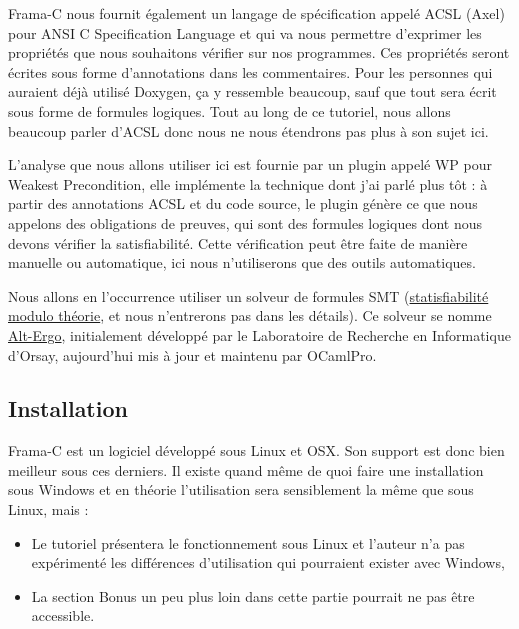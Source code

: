 \documentclass[12pt,francais,]{scrbook}
\newenvironment{zdsalertblock}[1]{%
  \tcolorbox[beamer,%
    noparskip,breakable,
    colback=LightCoral,colframe=DarkRed,%
    colbacklower=Tomato,%
    title=#1]
}{\endtcolorbox}
\begin{document}
Frama-C nous fournit également un langage de spécification appelé ACSL
(\og{}Axel\fg{}) pour ANSI C Specification Language et qui va nous permettre
d'exprimer les propriétés que nous souhaitons vérifier sur nos
programmes. Ces propriétés seront écrites sous forme d'annotations dans
les commentaires. Pour les personnes qui auraient déjà utilisé Doxygen,
ça y ressemble beaucoup, sauf que tout sera écrit sous forme de formules
logiques. Tout au long de ce tutoriel, nous allons beaucoup parler
d'ACSL donc nous ne nous étendrons pas plus à son sujet ici.

L'analyse que nous allons utiliser ici est fournie par un plugin appelé
WP pour Weakest Precondition, elle implémente la technique dont j'ai
parlé plus tôt : à partir des annotations ACSL et du code source, le
plugin génère ce que nous appelons des obligations de preuves, qui sont
des formules logiques dont nous devons vérifier la satisfiabilité. Cette
vérification peut être faite de manière manuelle ou automatique, ici
nous n'utiliserons que des outils automatiques.

Nous allons en l'occurrence utiliser un solveur de formules SMT
(\href{https://fr.wikipedia.org/wiki/Satisfiability_modulo_theories}{statisfiabilité
modulo théorie}, et nous n'entrerons pas dans les détails). Ce solveur
se nomme \href{http://alt-ergo.lri.fr/}{Alt-Ergo}, initialement
développé par le Laboratoire de Recherche en Informatique d'Orsay,
aujourd'hui mis à jour et maintenu par OCamlPro.

\subsection{Installation}\label{installation}

Frama-C est un logiciel développé sous Linux et OSX. Son support est
donc bien meilleur sous ces derniers. Il existe quand même de quoi faire
une installation sous Windows et en théorie l'utilisation sera
sensiblement la même que sous Linux, mais :

\begin{zdsalertblock}{Attention}
  \begin{itemize}
  \item Le tutoriel présentera le
    fonctionnement sous Linux et l'auteur n'a pas expérimenté les
    différences d'utilisation qui pourraient exister avec
    Windows,
  \item La section \og{}Bonus\fg{} un peu plus loin dans cette
    partie pourrait ne pas être accessible.
  \end{itemize}
\end{zdsalertblock}
\end{document}
